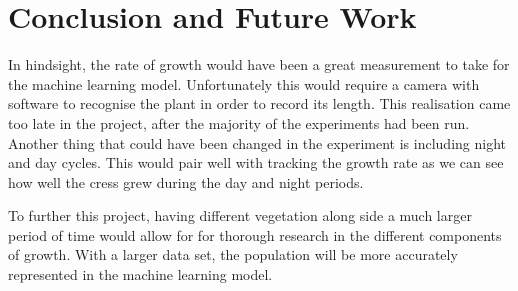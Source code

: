 \chapter{Conclusion and Future Work}




In hindsight, the rate of growth would have been a great measurement to take for the machine learning model. Unfortunately this would require a camera with software to recognise the plant in order to record its length. This realisation came too late in the project, after the majority of the experiments had been run. Another thing that could have been changed in the experiment is including night and day cycles. This would pair well with tracking the growth rate as we can see how well the cress grew during the day and night periods.

To further this project, having different vegetation along side a much larger period of time would allow for for thorough research in the different components of growth. With a larger data set, the population will be more accurately represented in the machine learning model.                                                                                                                         

